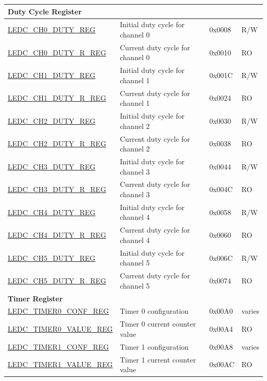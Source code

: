 \begin{longtable}{ | m{6cm} | p{6.7cm} | p{1.3cm} | p{1.5cm} | }
\multicolumn{4}{|l|}{\textbf{Duty Cycle Register}} \\ \hline
\hyperref[regdesc:LEDCCHNDUTYREG]{LEDC\_CH0\_DUTY\_REG} & Initial duty cycle for channel 0 & 0x0008 & R/W \\ \hline
\hyperref[regdesc:LEDCCHNDUTYRREG]{LEDC\_CH0\_DUTY\_R\_REG} & Current duty cycle for channel 0 & 0x0010 & RO \\ \hline
\hyperref[regdesc:LEDCCHNDUTYREG]{LEDC\_CH1\_DUTY\_REG} & Initial duty cycle for channel 1 & 0x001C & R/W \\ \hline
\hyperref[regdesc:LEDCCHNDUTYRREG]{LEDC\_CH1\_DUTY\_R\_REG} & Current duty cycle for channel 1 & 0x0024 & RO \\ \hline
\hyperref[regdesc:LEDCCHNDUTYREG]{LEDC\_CH2\_DUTY\_REG} & Initial duty cycle for channel 2 & 0x0030 & R/W \\ \hline
\hyperref[regdesc:LEDCCHNDUTYRREG]{LEDC\_CH2\_DUTY\_R\_REG} & Current duty cycle for channel 2 & 0x0038 & RO \\ \hline
\hyperref[regdesc:LEDCCHNDUTYREG]{LEDC\_CH3\_DUTY\_REG} & Initial duty cycle for channel 3 & 0x0044 & R/W \\ \hline
\hyperref[regdesc:LEDCCHNDUTYRREG]{LEDC\_CH3\_DUTY\_R\_REG} & Current duty cycle for channel 3 & 0x004C & RO \\ \hline
\hyperref[regdesc:LEDCCHNDUTYREG]{LEDC\_CH4\_DUTY\_REG} & Initial duty cycle for channel 4 & 0x0058 & R/W \\ \hline
\hyperref[regdesc:LEDCCHNDUTYRREG]{LEDC\_CH4\_DUTY\_R\_REG} & Current duty cycle for channel 4 & 0x0060 & RO \\ \hline
\hyperref[regdesc:LEDCCHNDUTYREG]{LEDC\_CH5\_DUTY\_REG} & Initial duty cycle for channel 5 & 0x006C & R/W \\ \hline
\hyperref[regdesc:LEDCCHNDUTYRREG]{LEDC\_CH5\_DUTY\_R\_REG} & Current duty cycle for channel 5 & 0x0074 & RO \\ \hline
\multicolumn{4}{|l|}{\textbf{Timer Register}} \\ \hline
\hyperref[regdesc:LEDCTIMERXCONFREG]{LEDC\_TIMER0\_CONF\_REG} & Timer 0 configuration & 0x00A0 & varies \\ \hline
\hyperref[regdesc:LEDCTIMERXVALUEREG]{LEDC\_TIMER0\_VALUE\_REG} & Timer 0 current counter value & 0x00A4 & RO \\ \hline
\hyperref[regdesc:LEDCTIMERXCONFREG]{LEDC\_TIMER1\_CONF\_REG} & Timer 1 configuration & 0x00A8 & varies \\ \hline
\hyperref[regdesc:LEDCTIMERXVALUEREG]{LEDC\_TIMER1\_VALUE\_REG} & Timer 1 current counter value & 0x00AC & RO \\ \hline

\end{longtable}
